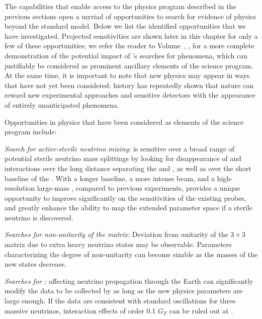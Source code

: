 The capabilities that enable access to the physics program described 
in the previous sections open a myriad of opportunities to search for 
evidence of physics beyond the standard model.  Below we list the 
identified opportunities that we have investigated.  
Projected sensitivities are shown later in this chapter for only 
a few of these opportunities; we refer the reader to  
Volume~\volnumberphysics{}, \voltitlephysics{}, for a more complete demonstration of 
the potential impact of 's searches for  phenomena,  
which can justifiably be considered as prominent ancillary 
elements of the  science program.  At the same time, it is 
important to note that new physics may appear in ways that have 
not yet been considered: history has repeatedly shown that nature 
can reward new experimental approaches and sensitive detectors 
with the appearance of entirely unanticipated phenomena.

Opportunities in  physics that have been considered 
as elements of the  science program include:

\textit{Search for active-sterile neutrino mixing:}  is sensitive over a broad range of potential sterile neutrino mass splittings by looking for disappearance of  and   interactions over the long distance separating the  and , as well as over the short baseline of the . With a longer baseline, a more intense beam, and a high-resolution large-mass , compared to previous experiments,  provides a unique opportunity to improve significantly on the sensitivities of the existing probes, and greatly enhance the ability to map the extended parameter space if a sterile neutrino is discovered.

\textit{Searches for non-unitarity of the  matrix:} Deviation from 
unitarity of the $3 \times 3$  matrix due to extra heavy 
neutrino states may be observable. 
Parameters characterizing the degree 
of non-unitarity can
become sizable as the masses of the new states decrease.

\textit{Searches for :} %
 affecting neutrino propagation through the Earth can significantly modify the data to be collected by  as long as the new physics parameters are large enough.  If the  data are consistent with standard oscillations for three massive neutrinos, interaction effects of order 0.1 $G_{F}$ can be ruled out at .


